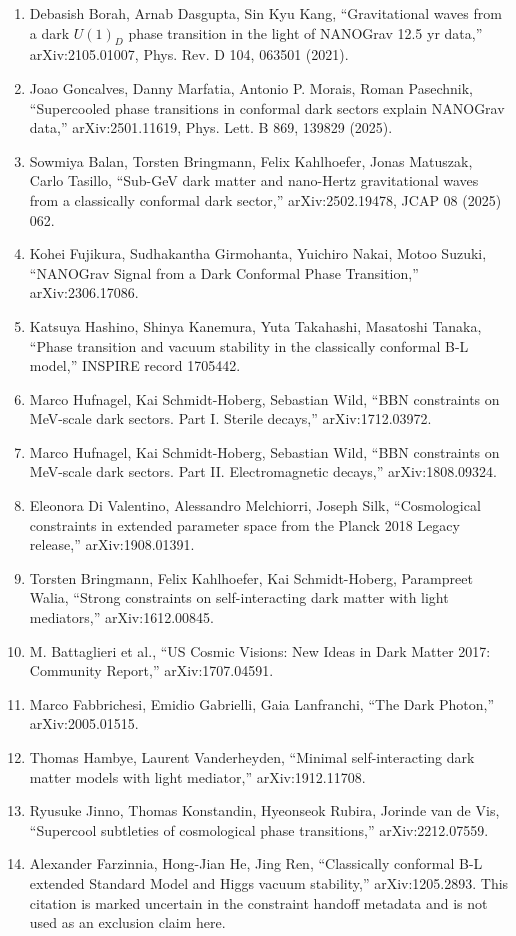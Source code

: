 \documentclass[11pt]{article}
\begin{document}
\begin{enumerate}
\item Debasish Borah, Arnab Dasgupta, Sin Kyu Kang, ``Gravitational waves from a dark \(U(1)_D\) phase transition in the light of NANOGrav 12.5 yr data,'' arXiv:2105.01007, Phys. Rev. D 104, 063501 (2021).
\item Joao Goncalves, Danny Marfatia, Antonio P. Morais, Roman Pasechnik, ``Supercooled phase transitions in conformal dark sectors explain NANOGrav data,'' arXiv:2501.11619, Phys. Lett. B 869, 139829 (2025).
\item Sowmiya Balan, Torsten Bringmann, Felix Kahlhoefer, Jonas Matuszak, Carlo Tasillo, ``Sub-GeV dark matter and nano-Hertz gravitational waves from a classically conformal dark sector,'' arXiv:2502.19478, JCAP 08 (2025) 062.
\item Kohei Fujikura, Sudhakantha Girmohanta, Yuichiro Nakai, Motoo Suzuki, ``NANOGrav Signal from a Dark Conformal Phase Transition,'' arXiv:2306.17086.
\item Katsuya Hashino, Shinya Kanemura, Yuta Takahashi, Masatoshi Tanaka, ``Phase transition and vacuum stability in the classically conformal B-L model,'' INSPIRE record 1705442.
\item Marco Hufnagel, Kai Schmidt-Hoberg, Sebastian Wild, ``BBN constraints on MeV-scale dark sectors. Part I. Sterile decays,'' arXiv:1712.03972.
\item Marco Hufnagel, Kai Schmidt-Hoberg, Sebastian Wild, ``BBN constraints on MeV-scale dark sectors. Part II. Electromagnetic decays,'' arXiv:1808.09324.
\item Eleonora Di Valentino, Alessandro Melchiorri, Joseph Silk, ``Cosmological constraints in extended parameter space from the Planck 2018 Legacy release,'' arXiv:1908.01391.
\item Torsten Bringmann, Felix Kahlhoefer, Kai Schmidt-Hoberg, Parampreet Walia, ``Strong constraints on self-interacting dark matter with light mediators,'' arXiv:1612.00845.
\item M. Battaglieri et al., ``US Cosmic Visions: New Ideas in Dark Matter 2017: Community Report,'' arXiv:1707.04591.
\item Marco Fabbrichesi, Emidio Gabrielli, Gaia Lanfranchi, ``The Dark Photon,'' arXiv:2005.01515.
\item Thomas Hambye, Laurent Vanderheyden, ``Minimal self-interacting dark matter models with light mediator,'' arXiv:1912.11708.
\item Ryusuke Jinno, Thomas Konstandin, Hyeonseok Rubira, Jorinde van de Vis, ``Supercool subtleties of cosmological phase transitions,'' arXiv:2212.07559.
\item Alexander Farzinnia, Hong-Jian He, Jing Ren, ``Classically conformal B-L extended Standard Model and Higgs vacuum stability,'' arXiv:1205.2893.  This citation is marked uncertain in the constraint handoff metadata and is not used as an exclusion claim here.
\end{enumerate}
\end{document}
